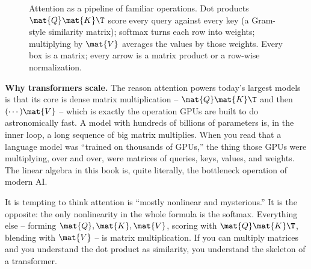 \begin{figure}[H]
\centering
{}
\caption{Attention as a pipeline of familiar operations. Dot products $\mat{Q}\mat{K}\T$
score every query against every key (a Gram-style similarity matrix); softmax turns each
row into weights; multiplying by $\mat{V}$ averages the values by those weights. Every box
is a matrix; every arrow is a matrix product or a row-wise normalization.}
\label{ch34:fig-attention}
\end{figure}

\begin{applicationbox}
\textbf{Why transformers scale.} The reason attention powers today's largest models is
that its core is dense matrix multiplication -- $\mat{Q}\mat{K}\T$ and then
$(\cdots)\mat{V}$ -- which is exactly the operation GPUs are built to do astronomically
fast. A model with hundreds of billions of parameters is, in the inner loop, a long
sequence of big matrix multiplies. When you read that a language model was ``trained on
thousands of GPUs,'' the thing those GPUs were multiplying, over and over, were matrices
of queries, keys, values, and weights. The linear algebra in this book is, quite
literally, the bottleneck operation of modern AI.
\end{applicationbox}

\begin{trapbox}
It is tempting to think attention is ``mostly nonlinear and mysterious.'' It is the
opposite: the only nonlinearity in the whole formula is the softmax. Everything else --
forming $\mat{Q},\mat{K},\mat{V}$, scoring with $\mat{Q}\mat{K}\T$, blending with
$\mat{V}$ -- is matrix multiplication. If you can multiply matrices and you understand the
dot product as similarity, you understand the skeleton of a transformer.
\end{trapbox}

